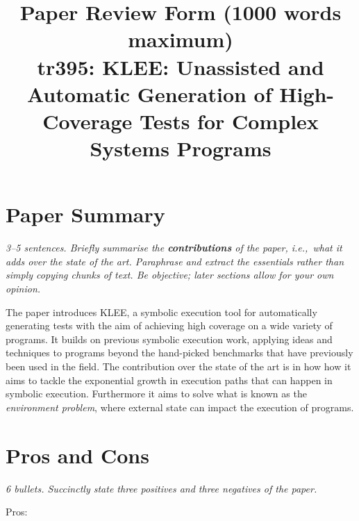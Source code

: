 \documentclass[11pt]{article}
\begin{document}

\title{Paper Review Form (1000 words maximum)\\
    tr395: KLEE: Unassisted and Automatic Generation of High-Coverage Tests for Complex Systems Programs \cite{KLEE}}

\maketitle

\section*{Paper Summary}

\textsl{3--5 sentences. Briefly summarise the {\bf contributions} of the paper,
i.e.,~what it adds over the state of the art. Paraphrase and extract the
essentials rather than simply copying chunks of text. Be objective; later
sections allow for your own opinion.}

The paper introduces KLEE, a symbolic execution tool for automatically
generating tests with the aim of achieving high coverage on a wide variety of
programs. It builds on previous symbolic execution work, applying ideas and
techniques to programs beyond the hand-picked benchmarks that have previously
been used in the field. The contribution over the state of the art is in how
how it aims to tackle the exponential growth in execution paths that can happen
in symbolic execution. Furthermore it aims to solve what is known as the
\textit{environment problem}, where external state can impact the execution of
programs.

\section*{Pros and Cons}

\textsl{6 bullets. Succinctly state three positives and three negatives of the
paper.}

Pros:
\end{document}
